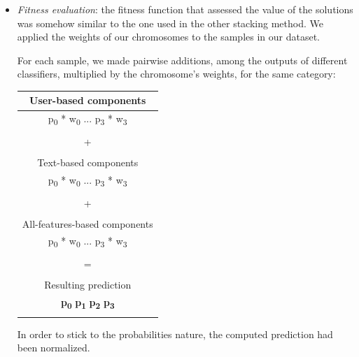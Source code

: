 \begin{itemize}
	\item[\PencilRight]\textit{Fitness evaluation}: the fitness function that assessed the value of the solutions was somehow similar to the one used in the other stacking method.
	We applied the weights of our chromosomes to the samples in our dataset.
	
	For each sample, we made pairwise additions, among the outputs of different classifiers, multiplied by the chromosome's weights, for the same category:
	\begin{center}
		\begin{tabular}{@{}c@{}}
			
			\multicolumn{1}{c}{User-based components}\\
			\hline
			\multicolumn{1}{c}{p\textsubscript{0} * w\textsubscript{0} ... p\textsubscript{3} * w\textsubscript{3}}\\
			\hline\\
			\multicolumn{1}{c}{+}\\
			
			\\\multicolumn{1}{c}{Text-based components}\\
			\hline
			\multicolumn{1}{c}{p\textsubscript{0} * w\textsubscript{0} ... p\textsubscript{3} * w\textsubscript{3}}\\
			\hline\\
			\multicolumn{1}{c}{+}\\
			
			\\\multicolumn{1}{c}{All-features-based components}\\
			\hline
			\multicolumn{1}{c}{p\textsubscript{0} * w\textsubscript{0} ... p\textsubscript{3} * w\textsubscript{3}}\\
			\hline\\
			\multicolumn{1}{c}{=}\\
			
			\\\multicolumn{1}{c}{Resulting prediction}\\
			\hline
			\multicolumn{1}{c}{\textbf{p\textsubscript{0}} \textbf{p\textsubscript{1}} \textbf{p\textsubscript{2}} \textbf{p\textsubscript{3}}}\\
			\hline\\
		\end{tabular}
	\end{center}
	
	In order to stick to the probabilities nature, the computed prediction had been normalized.
	

\end{itemize}
